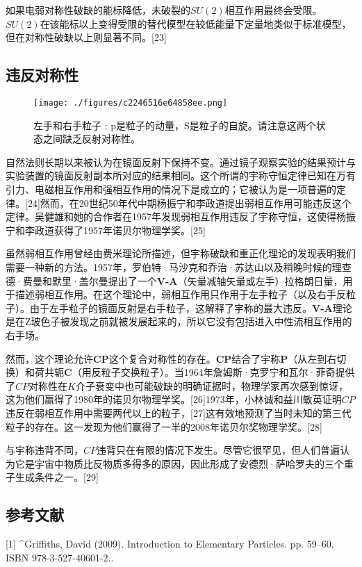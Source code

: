 如果电弱对称性破缺的能标降低，未破裂的$SU(2)$相互作用最终会受限。$SU(2)$在该能标以上变得受限的替代模型在较低能量下定量地类似于标准模型，但在对称性破缺以上则显著不同。[23]

\subsection{违反对称性}
\begin{figure}[ht]
\centering
\texttt{[image: ./figures/c2246516e64858ee.png]}
\caption{左手和右手粒子 : p是粒子的动量，S是粒子的自旋。请注意这两个状态之间缺乏反射对称性。} \label{fig_RXHZY_7}
\end{figure}
自然法则长期以来被认为在镜面反射下保持不变。通过镜子观察实验的结果预计与实验装置的镜面反射副本所对应的结果相同。这个所谓的宇称守恒定律已知在万有引力、电磁相互作用和强相互作用的情况下是成立的；它被认为是一项普遍的定律。[24]然而，在20世纪50年代中期杨振宁和李政道提出弱相互作用可能违反这个定律。吴健雄和她的合作者在1957年发现弱相互作用违反了宇称守恒，这使得杨振宁和李政道获得了1957年诺贝尔物理学奖。[25]

虽然弱相互作用曾经由费米理论所描述，但宇称破缺和重正化理论的发现表明我们需要一种新的方法。1957年，罗伯特·马沙克和乔治·苏达山以及稍晚时候的理查德·费曼和默里·盖尔曼提出了一个\textbf{V-A}（矢量减轴矢量或左手）拉格朗日量，用于描述弱相互作用。在这个理论中，弱相互作用只作用于左手粒子（以及右手反粒子）。由于左手粒子的镜面反射是右手粒子，这解释了宇称的最大违反。\textbf{V-A}理论是在Z玻色子被发现之前就被发展起来的，所以它没有包括进入中性流相互作用的右手场。

然而，这个理论允许\textbf{CP}这个复合对称性的存在。\textbf{CP}结合了宇称\textbf{P}（从左到右切换）和荷共轭\textbf{C}（用反粒子交换粒子）。当1964年詹姆斯·克罗宁和瓦尔·菲奇提供了$CP$对称性在$K$介子衰变中也可能破缺的明确证据时，物理学家再次感到惊讶，这为他们赢得了1980年的诺贝尔物理学奖。[26]1973年，小林诚和益川敏英证明$CP$违反在弱相互作用中需要两代以上的粒子，[27]这有效地预测了当时未知的第三代粒子的存在。这一发现为他们赢得了一半的2008年诺贝尔奖物理学奖。[28]

与宇称违背不同，$CP$违背只在有限的情况下发生。尽管它很罕见，但人们普遍认为它是宇宙中物质比反物质多得多的原因，因此形成了安德烈·萨哈罗夫的三个重子生成条件之一。[29]

\subsection{参考文献}
[1]
^Griffiths, David (2009). Introduction to Elementary Particles. pp. 59–60. ISBN 978-3-527-40601-2..

